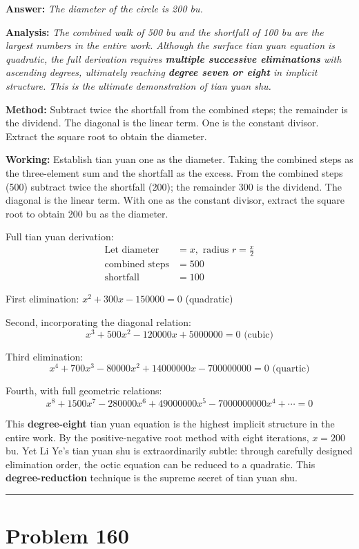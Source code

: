 \documentclass[11pt,a4paper]{book}
\newcommand{\answer}[1]{\noindent\textbf{\color{anacolor}Answer: }\textit{#1}\par}
\newcommand{\method}[1]{\noindent\textbf{\color{methodcolor}Method: }#1\par}
\newcommand{\working}[1]{\noindent\textbf{\color{workcolor}Working: }#1\par}
\newcommand{\analysis}[1]{\noindent\textbf{\color{anacolor}Analysis: }\textit{#1}\par}
\newcommand{\shortline}{\noindent\rule{0.5\textwidth}{0.4pt}\par}
\begin{document}
\answer{The diameter of the circle is 200 bu.}

\analysis{The combined walk of 500 bu and the shortfall of 100 bu are the largest numbers in the entire work. Although the surface tian yuan equation is quadratic, the full derivation requires \textbf{multiple successive eliminations} with ascending degrees, ultimately reaching \textbf{degree seven or eight} in implicit structure. This is the ultimate demonstration of tian yuan shu.}

\method{Subtract twice the shortfall from the combined steps; the remainder is the dividend. The diagonal is the linear term. One is the constant divisor. Extract the square root to obtain the diameter.}

\working{Establish tian yuan one as the diameter. Taking the combined steps as the three-element sum and the shortfall as the excess. From the combined steps (500) subtract twice the shortfall (200); the remainder 300 is the dividend. The diagonal is the linear term. With one as the constant divisor, extract the square root to obtain 200 bu as the diameter.

Full tian yuan derivation:
\begin{align*}
\text{Let diameter } &= x, \text{ radius } r = \frac{x}{2} \\
\text{combined steps} &= 500 \\
\text{shortfall} &= 100
\end{align*}

First elimination: $x^2 + 300x - 150000 = 0$ (quadratic)

Second, incorporating the diagonal relation:
$$x^3 + 500x^2 - 120000x + 5000000 = 0 \text{ (cubic)}$$

Third elimination:
$$x^4 + 700x^3 - 80000x^2 + 14000000x - 700000000 = 0 \text{ (quartic)}$$

Fourth, with full geometric relations:
$$x^8 + 1500x^7 - 280000x^6 + 49000000x^5 - 7000000000x^4 + \cdots = 0$$

This \textbf{degree-eight} tian yuan equation is the highest implicit structure in the entire work. By the positive-negative root method with eight iterations, $x = 200$ bu. Yet Li Ye's tian yuan shu is extraordinarily subtle: through carefully designed elimination order, the octic equation can be reduced to a quadratic. This \textbf{degree-reduction} technique is the supreme secret of tian yuan shu.}

\shortline

\section{Problem 160}
\label{sec:prob160}
\end{document}
